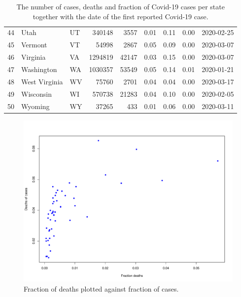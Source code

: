 \documentclass[12pt,a4paper]{article}
\begin{document}
\begin{table}[H]
{\begin{tabular}{rllrrrrrl}
		44 & Utah & UT & 340148 & 3557 & 0.01 & 0.11 & 0.00 & 2020-02-25 \\ 
		45 & Vermont & VT & 54998 & 2867 & 0.05 & 0.09 & 0.00 & 2020-03-07 \\ 
		46 & Virginia & VA & 1294819 & 42147 & 0.03 & 0.15 & 0.00 & 2020-03-07 \\ 
		47 & Washington & WA & 1030357 & 53549 & 0.05 & 0.14 & 0.01 & 2020-01-21 \\ 
		48 & West Virginia & WV & 75760 & 2701 & 0.04 & 0.04 & 0.00 & 2020-03-17 \\ 
		49 & Wisconsin & WI & 570738 & 21283 & 0.04 & 0.10 & 0.00 & 2020-02-05 \\ 
		50 & Wyoming & WY & 37265 & 433 & 0.01 & 0.06 & 0.00 & 2020-03-11 \\ 
		\hline
	\end{tabular}
    }
\caption{The number of cases, deaths and fraction of Covid-19 cases per state together with the date of the first reported Covid-19 case.}
\end{table}
 



\begin{figure}[H]
	\begin{center}
	\includegraphics[width=\columnwidth]{rplot.pdf}
	\caption{Fraction of deaths plotted against fraction of cases.}
	\label{Fig1}
	\end{center}
\end{figure}
\end{document}
